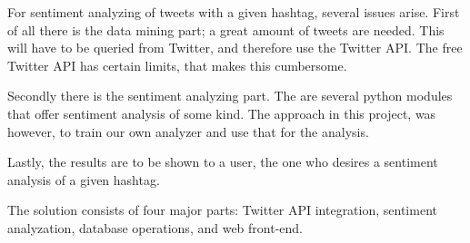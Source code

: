 \documentclass[Main]{subfiles}
\begin{document}
For sentiment analyzing of tweets with a given hashtag, several issues arise. First of all there is the data mining part; a great amount of tweets are needed. This will have to be queried from Twitter, and therefore use the Twitter API. The free Twitter API has certain limits, that makes this cumbersome. 

Secondly there is the sentiment analyzing part. The are several python modules that offer sentiment analysis of some kind. The approach in this project, was however, to train our own analyzer and use that for the analysis. 

Lastly, the results are to be shown to a user, the one who desires a sentiment analysis of a given hashtag. 

The solution consists of four major parts: Twitter API integration, sentiment analyzation, database operations, and web front-end.
\end{document}
